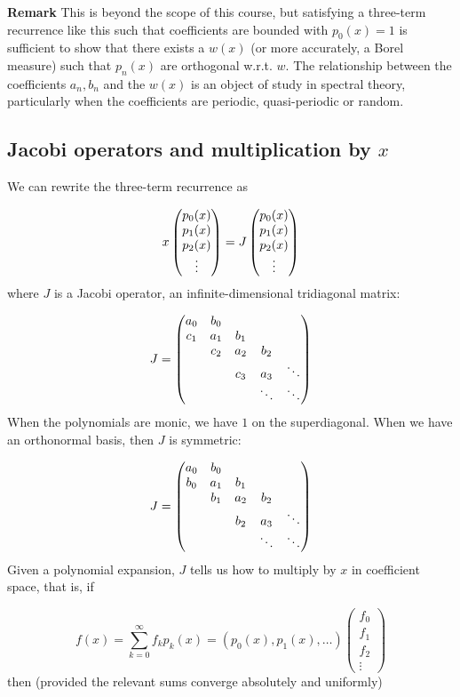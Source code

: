 \documentclass[12pt,a4paper]{article}
\begin{document}
\textbf{Remark} This is beyond the scope of this course, but satisfying a three-term recurrence like this such that coefficients  are bounded with $p_0(x) = 1$ is sufficient to show that there exists a $w(x)$ (or more accurately, a Borel measure)  such that $p_n(x)$ are orthogonal w.r.t. $w$. The relationship between the coefficients $a_n,b_n$ and the $w(x)$ is  an object of study in spectral theory, particularly when the coefficients are periodic, quasi-periodic or random.  

\subsection{Jacobi operators and multiplication by $x$}
We can rewrite the three-term recurrence as

\[
x \begin{pmatrix} p_0(x) \cr p_1(x) \cr p_2(x) \cr \vdots \end{pmatrix} = J\begin{pmatrix} p_0(x) \cr p_1(x) \cr p_2(x) \cr \vdots \end{pmatrix}
\]
where $J$ is a Jacobi operator, an infinite-dimensional tridiagonal matrix:

\[
J = \begin{pmatrix} 
a_0 & b_0 \cr
c_1 & a_1 & b_1 \cr
& c_2 & a_2 & b_2 \cr
&& c_3 & a_3 & \ddots \cr
&&&\ddots & \ddots
\end{pmatrix} 
\]
When the polynomials are monic, we have $1$ on the superdiagonal.  When we have an orthonormal basis, then $J$ is symmetric:

\[
J = \begin{pmatrix} 
a_0 & b_0 \cr
b_0 & a_1 & b_1 \cr
& b_1 & a_2 & b_2 \cr
&& b_2 & a_3 & \ddots \cr
&&&\ddots & \ddots
\end{pmatrix} 
\]
Given a polynomial expansion, $J$ tells us how to multiply by $x$ in coefficient space, that is, if

\[
f(x) = \sum_{k=0}^\infty f_k p_k(x) =   (p_0(x) ,  p_1(x) , \ldots ) \begin{pmatrix}f_0\\ f_1\\f_2\\\vdots\end{pmatrix}
\]
then (provided the relevant sums converge absolutely and uniformly)
\end{document}
